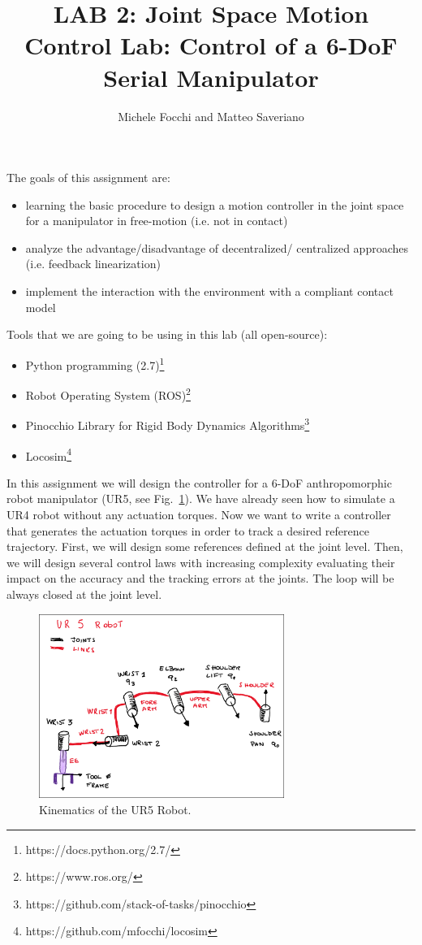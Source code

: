 \documentclass[11pt]{article}
\title{LAB 2: Joint Space Motion Control Lab: Control of a 6-DoF Serial Manipulator}
\author{Michele Focchi and Matteo Saveriano}
\date{}
\begin{document}
	\maketitle
	\noindent
	The goals of this assignment are:
	\begin{itemize}
		\item learning the basic procedure to design a motion controller in the joint space for a manipulator in free-motion (i.e. not in contact)
		\item analyze the advantage/disadvantage of decentralized/ centralized approaches (i.e. feedback linearization)
		\item implement the interaction with the environment with a compliant contact model	 
	\end{itemize}
	
	\noindent
	Tools that we are going to be using in this lab (all open-source):
	\begin{itemize}
		\item Python programming (2.7)\footnote{https://docs.python.org/2.7/}
		\item Robot Operating System (ROS)\footnote{https://www.ros.org/}
		\item Pinocchio Library for Rigid Body Dynamics Algorithms\footnote{https://github.com/stack-of-tasks/pinocchio}
		\item Locosim\footnote{https://github.com/mfocchi/locosim}
	\end{itemize}
	In this assignment we will  design the controller for a 6-DoF anthropomorphic robot manipulator (UR5, see  Fig.~\ref{fig:UR5}). We have already seen how to simulate a UR4 robot without any actuation torques. Now we want to write a controller that generates the actuation torques in order to track a desired reference trajectory. First, we will design some references defined at the joint level. Then, we will design several control laws with increasing complexity evaluating their impact on the accuracy and the tracking errors at the joints. The loop will be always closed at the joint level.  
 
 \begin{figure}[bht]
 	\centering
 	\includegraphics[width=8cm]{pics/ur5_Robot.pdf}
 	\caption{Kinematics of the UR5 Robot.}
 	\label{fig:UR5}
 \end{figure}
\end{document}
